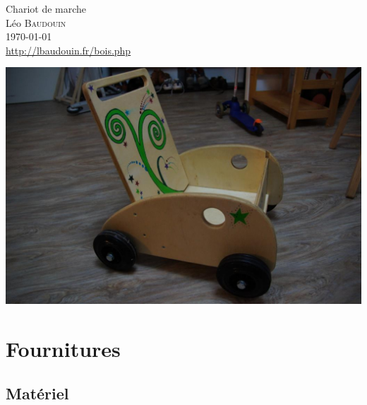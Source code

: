 \documentclass[a4paper,oneside]{article}
\newcommand{\newtitle}{Chariot de marche}
\newcommand{\newauthor}{L\'eo \textsc{Baudouin}}
\begin{document}
\vspace{-3cm}
\begin{center}
{\huge \newtitle}\\
\vspace{3mm}
\newauthor\\
\vspace{3mm}
\today\\
\vspace{3mm}
\url{http://lbaudouin.fr/bois.php}
\vspace{3mm}

\includegraphics[width=0.6\linewidth]{images/chariot.jpg}

\end{center}



\section{Fournitures}

\subsection{Matériel}
\end{document}

